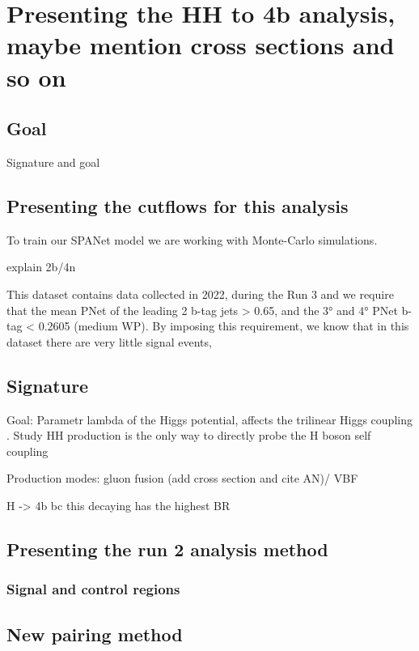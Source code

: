 \section{Presenting the HH to 4b analysis, maybe mention cross sections and so on} \label{section: HH4b}

\subsection{Goal}

Signature and goal

\subsection{Presenting the cutflows for this analysis} \label{subsection:cutflows}
To train our SPANet model we are working with Monte-Carlo simulations. 

explain 2b/4n

This dataset contains data collected in 2022, during the Run 3 and we require that the mean PNet of the leading 2 b-tag jets > 0.65, and the 3° and 4° PNet b-tag < 0.2605 (medium WP). By imposing this requirement, we know that in this dataset there are very little signal events, 

\subsection{Signature}

Goal: Parametr lambda of the Higgs potential, affects the trilinear Higgs coupling . Study HH production is the only way to directly probe the H boson self coupling 

Production modes: gluon fusion (add cross section and cite AN)/ VBF

H -> 4b bc this decaying has the highest BR

\subsection{Presenting the run 2 analysis method}

\subsubsection{Signal and control regions}
\subsection{New pairing method}

